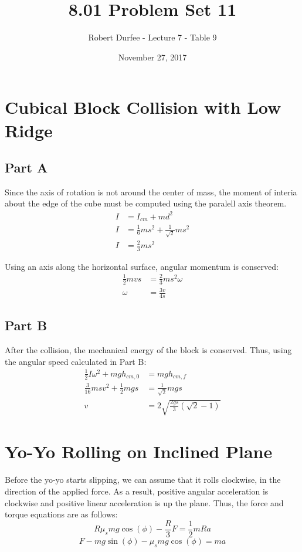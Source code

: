 \documentclass{article}
\title{ 8.01 Problem Set 11 }
\author{ Robert Durfee - Lecture 7 - Table 9 }
\date{ November 27, 2017 }
\begin{document}
\maketitle

\section{ Cubical Block Collision with Low Ridge }

\subsection*{ Part A }

Since the axis of rotation is not around the center of mass, the moment of
interia about the edge of the cube must be computed using the paralell axis
theorem.
\begin{align*}
    I &= I_{cm} + md^{2} \\
    I &= \frac{1}{6} ms^{2} + \frac{1}{\sqrt{ 2 }} ms^{2} \\
    I &= \frac{2}{3} ms^{2}
\end{align*}

Using an axis along the horizontal surface, angular momentum is conserved:
\begin{align*}
    \frac{1}{2} mvs &= \frac{2}{3} ms^{2}\omega \\
    \omega &= \frac{3v}{4s}
\end{align*}

\subsection*{ Part B }

After the collision, the mechanical energy of the block is conserved. Thus,
using the angular speed calculated in Part B:
\begin{align*}
    \frac{1}{2} I\omega^{2} + mgh_{cm,0} &= mgh_{cm,f} \\
    \frac{3}{16} msv^{2} + \frac{1}{2} mgs &= \frac{1}{\sqrt{ 2 }} mgs \\
    v &= 2 \sqrt{ \frac{2gs}{3} \left( \sqrt{ 2 } - 1 \right) }
\end{align*}

\section{ Yo-Yo Rolling on Inclined Plane }

Before the yo-yo starts slipping, we can assume that it rolls clockwise, in the
direction of the applied force. As a result, positive angular acceleration is
clockwise and positive linear acceleration is up the plane. Thus, the force and
torque equations are as follows:
$$ R\mu_{s}mg \cos \left( \phi \right) - \frac{ R }{ 3 }F = \frac{ 1 }{ 2 } mRa $$
$$ F - mg \sin \left( \phi \right) - \mu_{s}mg \cos \left( \phi \right) = ma $$
\end{document}

